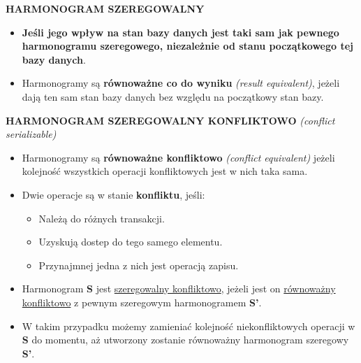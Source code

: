 \documentclass[a5paper,6pt]{article}
\begin{document}
    \vskip 0.5cm

    \textbf{HARMONOGRAM SZEREGOWALNY}
    \begin{itemize}
        \item \textbf{Jeśli jego wpływ na stan bazy danych jest taki sam jak
              pewnego harmonogramu szeregowego, niezależnie od stanu
              początkowego tej bazy danych}.
        \item Harmonogramy są \textbf{równoważne co do wyniku}
              \textit{(result equivalent)}, jeżeli dają ten sam stan bazy danych
              bez względu na początkowy stan bazy.
    \end{itemize}

    \textbf{HARMONOGRAM SZEREGOWALNY KONFLIKTOWO}
    \textit{(conflict serializable)}
    \begin{itemize}
        \item Harmonogramy są \textbf{równoważne konfliktowo}
              \textit{(conflict equivalent)} jeżeli kolejność wszystkich
              operacji konfliktowych jest w nich taka sama.
        \item Dwie operacje są w stanie \textbf{konfliktu}, jeśli:
        \begin{itemize}
            \item Należą do różnych transakcji.
            \item Uzyskują dostep do tego samego elementu.
            \item Przynajmnej jedna z nich jest operacją zapisu.
        \end{itemize}

        \item Harmonogram \textbf{S} jest \underline{szeregowalny konfliktowo},
        jeżeli jest on \underline{równoważny} \underline{konfliktowo} z pewnym
        szeregowym harmonogramem \textbf{S'}.
        \item W takim przypadku możemy zamieniać kolejność niekonfliktowych
        operacji w \textbf{S} do momentu, aż utworzony zostanie równoważny
        harmonogram szeregowy \textbf{S'}.
    \end{itemize}

\pagebreak
\end{document}
